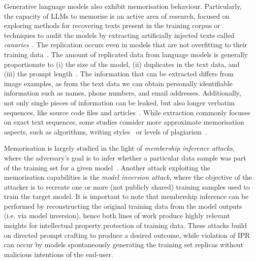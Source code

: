 \documentclass[conference]{IEEEtran}
\begin{document}
Generative language models also exhibit memorisation behaviour. Particularly, the capacity of LLMs to memorise is an active area of research, focused on exploring methods for recovering texts present in the training corpus or techniques to audit the models by extracting artificially injected texts called \textit{canaries}~\cite{carlini_secret_2019}. The replication occurs even in models that are not overfitting to their training data~\cite{tirumala_memorization_2022,jagielski_measuring_2023}. 
The amount of replicated data from language models is generally proportionate to (i) the size of the model, (ii) duplicates in the text data, and (iii) the prompt length~\cite{carlini_quantifying_2023,carlini_extracting_2021}. The information that can be extracted differs from image examples, as from the text data we can obtain personally identifiable information such as names, phone numbers, and email addresses. Additionally, not only single pieces of information can be leaked, but also longer verbatim sequences, like source code files and articles~\cite{carlini_extracting_2021}. While extraction commonly focuses on exact text sequences, some studies consider more approximate memorisation aspects, such as algorithms, writing styles~\cite{hartmann_sok_2023} or levels of plagiarism~\cite{lee_language_2023}.


Memorisation is largely studied in the light of \textit{membership inference attacks}, where the adversary's goal is to infer whether a particular data sample was part of the training set for a given model~\cite{webster_this_2021,hu_membership_2023,matsumoto_membership_2023}.
Another attack exploiting the memorisation capabilities is the \textit{model inversion attack}, where the objective of the attacker is to recreate one or more (not publicly shared) training samples used to train the target model\cite{yin_dreaming_2020,ghiasi_plug-inversion_2022,carlini_extracting_2023}. 
It is important to note that membership inference can be performed by reconstructing the original training data from the model outputs (i.e. via model inversion), hence both lines of work produce highly relevant insights for intellectual property protection of training data.
These attacks build on directed prompt crafting to produce a desired outcome, while violation of IPR can occur by models spontaneously generating the training set replicas without malicious intentions of the end-user.
\end{document}
